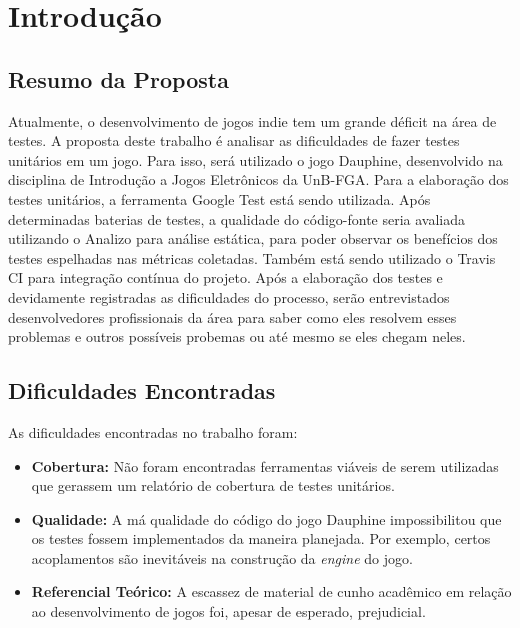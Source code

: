 \chapter[Introdução]{Introdução}

\section{Resumo da Proposta}
Atualmente, o desenvolvimento de jogos indie tem um grande déficit na área de testes. A proposta deste trabalho é analisar as dificuldades de fazer testes unitários em um jogo. Para isso, será utilizado o jogo Dauphine, desenvolvido na disciplina de Introdução a Jogos Eletrônicos da UnB-FGA. Para a elaboração dos testes unitários, a ferramenta Google Test está sendo utilizada. Após determinadas baterias de testes, a qualidade do código-fonte seria avaliada utilizando o Analizo para análise estática, para poder observar os benefícios dos testes espelhadas nas métricas coletadas. Também está sendo utilizado o Travis CI para integração contínua do projeto. Após a elaboração dos testes e devidamente registradas as dificuldades do processo, serão entrevistados desenvolvedores profissionais da área para saber como eles resolvem esses problemas e outros possíveis probemas ou até mesmo se eles chegam neles.

\section{Dificuldades Encontradas}
As dificuldades encontradas no trabalho foram:
\begin{itemize}
\item \textbf{Cobertura:} Não foram encontradas ferramentas viáveis de serem utilizadas que gerassem um relatório de cobertura de testes unitários.
\item \textbf{Qualidade:} A má qualidade do código do jogo Dauphine impossibilitou que os testes fossem implementados da maneira planejada. Por exemplo, certos acoplamentos são inevitáveis na construção da \textit{engine} do jogo.
\item \textbf{Referencial Teórico:} A escassez de material de cunho acadêmico em relação ao desenvolvimento de jogos foi, apesar de esperado, prejudicial.
\end{itemize}
